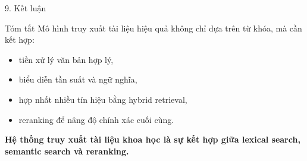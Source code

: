 \documentclass[aspectratio=169]{beamer}
\begin{document}
\begin{frame}{9. Kết luận}
  \begin{block}{Tóm tắt}
    Mô hình truy xuất tài liệu hiệu quả không chỉ dựa trên từ khóa, mà cần kết hợp:
    \begin{itemize}
      \item tiền xử lý văn bản hợp lý,\
      \item biểu diễn tần suất và ngữ nghĩa,\
      \item hợp nhất nhiều tín hiệu bằng hybrid retrieval,\
      \item reranking để nâng độ chính xác cuối cùng.
    \end{itemize}
  \end{block}

  \vspace{0.3cm}
  \begin{center}
    \Large \textbf{Hệ thống truy xuất tài liệu khoa học là sự kết hợp giữa lexical search, semantic search và reranking.}
  \end{center}
\end{frame}
\end{document}
